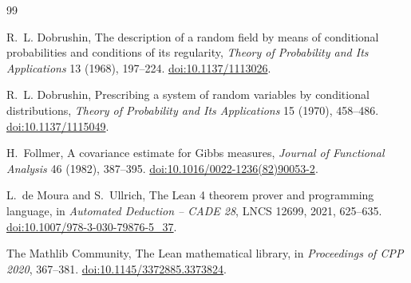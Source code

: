 \documentclass[11pt]{article}
\theoremstyle{definition}
\begin{document}
\begin{thebibliography}{99}

R.~L. Dobrushin,
\newblock The description of a random field by means of conditional
probabilities and conditions of its regularity,
\newblock \emph{Theory of Probability and Its Applications} 13 (1968),
197--224.
\newblock \href{https://doi.org/10.1137/1113026}{doi:10.1137/1113026}.

R.~L. Dobrushin,
\newblock Prescribing a system of random variables by conditional
distributions,
\newblock \emph{Theory of Probability and Its Applications} 15 (1970),
458--486.
\newblock \href{https://doi.org/10.1137/1115049}{doi:10.1137/1115049}.

H.~Follmer,
\newblock A covariance estimate for Gibbs measures,
\newblock \emph{Journal of Functional Analysis} 46 (1982), 387--395.
\newblock \href{https://doi.org/10.1016/0022-1236(82)90053-2}{doi:10.1016/0022-1236(82)90053-2}.

L.~de Moura and S.~Ullrich,
\newblock The Lean 4 theorem prover and programming language,
\newblock in \emph{Automated Deduction -- CADE 28}, LNCS 12699, 2021,
625--635.
\newblock \href{https://doi.org/10.1007/978-3-030-79876-5_37}{doi:10.1007/978-3-030-79876-5\_37}.

The Mathlib Community,
\newblock The Lean mathematical library,
\newblock in \emph{Proceedings of CPP 2020}, 367--381.
\newblock \href{https://doi.org/10.1145/3372885.3373824}{doi:10.1145/3372885.3373824}.

\end{thebibliography}
\end{document}

